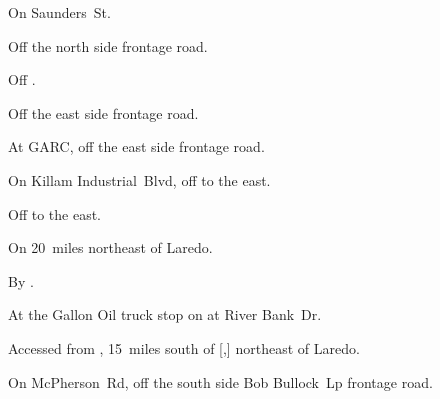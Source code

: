 
\begin{LocationList}

On  Saunders~St.

Off the north side  frontage road.

\Location{\GarageHQ \Garage}
Off .

Off the east side  frontage road.

At GARC, off the east side  frontage road.

On Killam Industrial~Blvd, off  to the east.

Off  to the east.

On  20~miles northeast of Laredo.

\Location{\RecruitmentAgency \Recruitment}
By .

At the Gallon Oil truck stop on  at River Bank~Dr.

Accessed from , 15~miles south of [,] northeast of Laredo.

On McPherson~Rd, off the south side   Bob Bullock~Lp frontage road.

\end{LocationList}
